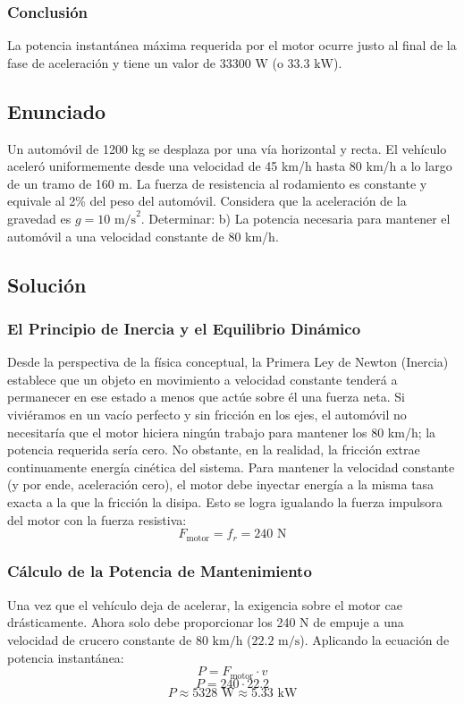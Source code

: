 \documentclass[a4paper,12pt]{article}
\begin{document}
\subsubsection*{Conclusión}
La potencia instantánea máxima requerida por el motor ocurre justo al final de la fase de aceleración y tiene un valor de $33300\text{ W}$ (o $33.3\text{ kW}$).

\newpage
\subsection*{Enunciado}
Un automóvil de 1200 kg se desplaza por una vía horizontal y recta. El vehículo aceleró uniformemente desde una velocidad de 45 km/h hasta 80 km/h a lo largo de un tramo de 160 m. La fuerza de resistencia al rodamiento es constante y equivale al 2\% del peso del automóvil. Considera que la aceleración de la gravedad es $g = 10\text{ m/s}^2$. 
Determinar:
b) La potencia necesaria para mantener el automóvil a una velocidad constante de 80 km/h.

\subsection*{Solución}

\subsubsection*{El Principio de Inercia y el Equilibrio Dinámico}
Desde la perspectiva de la física conceptual, la Primera Ley de Newton (Inercia) establece que un objeto en movimiento a velocidad constante tenderá a permanecer en ese estado a menos que actúe sobre él una fuerza neta. Si viviéramos en un vacío perfecto y sin fricción en los ejes, el automóvil no necesitaría que el motor hiciera ningún trabajo para mantener los 80 km/h; la potencia requerida sería cero.
No obstante, en la realidad, la fricción extrae continuamente energía cinética del sistema. Para mantener la velocidad constante (y por ende, aceleración cero), el motor debe inyectar energía a la misma tasa exacta a la que la fricción la disipa. Esto se logra igualando la fuerza impulsora del motor con la fuerza resistiva:
$$F_{\text{motor}} = f_r = 240\text{ N}$$

\subsubsection*{Cálculo de la Potencia de Mantenimiento}
Una vez que el vehículo deja de acelerar, la exigencia sobre el motor cae drásticamente. Ahora solo debe proporcionar los 240 N de empuje a una velocidad de crucero constante de $80\text{ km/h}$ ($22.2\text{ m/s}$).
Aplicando la ecuación de potencia instantánea:
$$P = F_{\text{motor}} \cdot v$$
$$P = 240 \cdot 22.2$$
$$P \approx 5328\text{ W} \approx 5.33\text{ kW}$$
\end{document}
